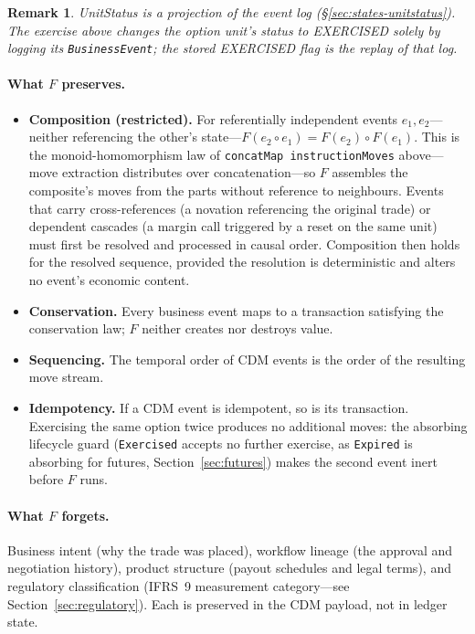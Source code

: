 \documentclass[11pt,a4paper]{article}
\newtheorem{remark}[definition]{Remark}
\begin{document}
\begin{remark}
UnitStatus is a projection of the event log (\S\ref{sec:states-unitstatus}). The exercise above changes the option unit's status to EXERCISED solely by logging its \texttt{BusinessEvent}; the stored EXERCISED flag is the replay of that log.
\end{remark}

\paragraph{What \texorpdfstring{$F$}{F} preserves.}
\begin{itemize}[nosep]
\item \textbf{Composition (restricted).} For referentially independent events $e_1, e_2$---neither referencing the other's state---$F(e_2 \circ e_1) = F(e_2) \circ F(e_1)$. This is the monoid-homomorphism law of \texttt{concatMap instructionMoves} above---move extraction distributes over concatenation---so $F$ assembles the composite's moves from the parts without reference to neighbours. Events that carry cross-references (a novation referencing the original trade) or dependent cascades (a margin call triggered by a reset on the same unit) must first be resolved and processed in causal order. Composition then holds for the resolved sequence, provided the resolution is deterministic and alters no event's economic content.
\item \textbf{Conservation.} Every business event maps to a transaction satisfying the conservation law; $F$ neither creates nor destroys value.
\item \textbf{Sequencing.} The temporal order of CDM events is the order of the resulting move stream.
\item \textbf{Idempotency.} If a CDM event is idempotent, so is its transaction. Exercising the same option twice produces no additional moves: the absorbing lifecycle guard (\texttt{Exercised} accepts no further exercise, as \texttt{Expired} is absorbing for futures, Section~\ref{sec:futures}) makes the second event inert before $F$ runs.
\end{itemize}

\paragraph{What \texorpdfstring{$F$}{F} forgets.} Business intent (why the trade was placed), workflow lineage (the approval and negotiation history), product structure (payout schedules and legal terms), and regulatory classification (IFRS~9 measurement category---see Section~\ref{sec:regulatory}). Each is preserved in the CDM payload, not in ledger state.
\end{document}

